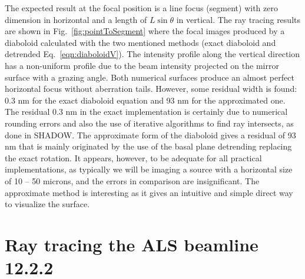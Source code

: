 \documentclass{iucr}              %
\begin{document}
The expected result at the focal position is a line focus (segment) with zero dimension in horizontal and a length of $L\sin\theta$ in vertical. The ray tracing results are shown in Fig.~\ref{fig:pointToSegment} where the focal images produced by a diaboloid calculated with the two mentioned methods (exact diaboloid and detrended Eq.~\ref{eqn:diaboloidV}).
The intensity profile along the vertical direction has a non-uniform profile due to the beam intensity projected on the mirror surface with a grazing angle.
Both numerical surfaces produce an almost perfect horizontal focus without aberration tails. However, some residual width is found: 0.3 nm for the exact diaboloid equation and 93 nm for the approximated one. 
The residual 0.3 nm in the exact implementation is certainly due to numerical rounding errors and also the use of iterative algorithms to find ray intersects, as done in SHADOW.
The approximate form of the diaboloid gives a residual of 93 nm that is mainly originated by the use of the basal plane detrending replacing the exact rotation. It appears, however, to be adequate for all practical implementations, as typically we will be imaging a source with a horizontal size of 10 – 50 microns, and the errors in comparison are insignificant. The approximate method is interesting as it gives an intuitive and simple direct way to visualize the surface.

\section{Ray tracing the ALS beamline 12.2.2}
\label{sec:beamline}
\end{document}

